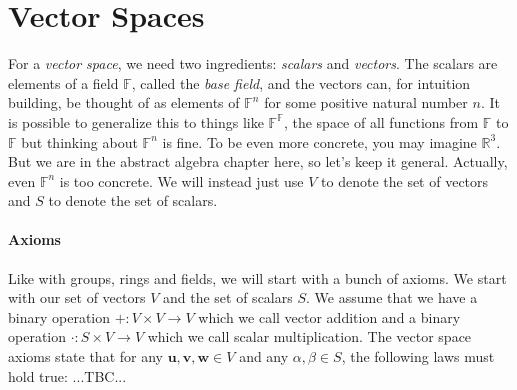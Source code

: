 \section{Vector Spaces}
For a \emph{vector space}, we need two ingredients: \emph{scalars} and \emph{vectors}. The scalars are elements of a field $\mathbb{F}$, called the \emph{base field}, and the vectors can, for intuition building, be thought of as elements of $\mathbb{F}^n$ for some positive natural number $n$. It is possible to generalize this to things like $\mathbb{F}^\mathbb{F}$, the space of all functions from $\mathbb{F}$ to $\mathbb{F}$ but thinking about $\mathbb{F}^n$ is fine. To be even more concrete, you may imagine $\mathbb{R}^3$. But we are in the abstract algebra chapter here, so let's keep it general. Actually, even $\mathbb{F}^n$ is too concrete. We will instead just use $V$ to denote the set of vectors and $S$ to denote the set of scalars. 




\paragraph{Axioms} Like with groups, rings and fields, we will start with a bunch of axioms. We start with our set of vectors $V$ and the set of scalars $S$. We assume that we have a binary operation $+: V \times V \rightarrow V$ which we call vector addition and a binary operation $\cdot : S \times V \rightarrow V$ which we call scalar multiplication. The vector space axioms state that for any $\mathbf{u,v,w} \in V$ and any $\alpha, \beta \in S$, the following laws must hold true: ...TBC...





